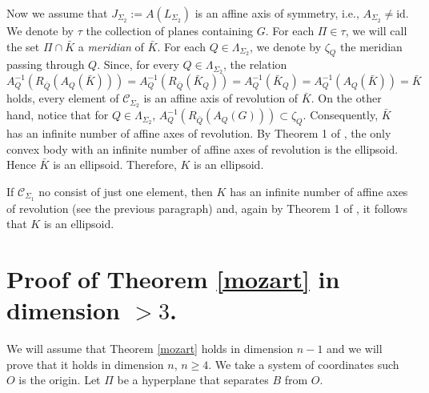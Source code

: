 \documentclass[12pt]{amsart}
\begin{document}
                  Now we assume that $J_{\Sigma_2}:=A(L_{\Sigma_2})$ is an affine axis of symmetry, 
                  i.e., $ A_{\Sigma_2}\not=\textrm{id}$. We denote by $\tau$ the collection of planes 
                  containing $G$. For each $\Pi \in \tau$, we will call the set $\Pi \cap \bar{K}$ a 
                  \textit{meridian} of $\bar{K}$. For each $Q \in  \Lambda_{\Sigma_2}$, we denote by 
                  $\zeta_Q$ the meridian passing through $Q$. Since, for every 
                  $Q\in \Lambda_{\Sigma_2}$, the relation 
\[
A_{Q}^{-1}(R_{\bar{Q}}(A_{Q}(\bar{K})))=A_{Q}^{-1}(R_{\bar{Q}}(\bar{K}_Q))=A_{Q}^{-1}( \bar{K}_Q)=
A_{Q}^{-1}(A_Q(\bar{K}))=\bar{K} 
\]
                  holds, every element of $\mathcal{C}_{\Sigma_2}$ is an affine axis of revolution of 
                  $\bar{K}$. On the other hand, notice that for $Q\in \Lambda_{\Sigma_2}$,  
                  $A_{Q}^{-1}(R_{\bar{Q}}(A_{Q}(G)))\subset \zeta_Q$. Consequently, $\bar{K}$ has an 
                  infinite number of affine axes of revolution. By Theorem 1 of \cite{espanol}, the only 
                  convex body with an infinite number of affine axes of revolution is the ellipsoid. Hence 
                  $\bar{K}$ is an ellipsoid. Therefore, $K$ is an ellipsoid.  

                  If $\mathcal{C}_{\Sigma_1}$ no consist of just one element, then $K$ has an infinite 
                  number of affine axes of revolution (see the previous paragraph) and, again by Theorem 
                  1 of \cite{espanol}, it  follows that $K$ is an ellipsoid.

                  
                  
\section{Proof of Theorem \ref{mozart} in dimension $>3$.}
                  We will assume that Theorem \ref{mozart} holds in dimension $n-1$ and we will prove 
                  that it holds in dimension $n$, $n\geq 4$. We take a system of coordinates such $O$ is 
                  the origin. Let $\Pi$ be a hyperplane that separates $B$ from $O$. 
\end{document}
